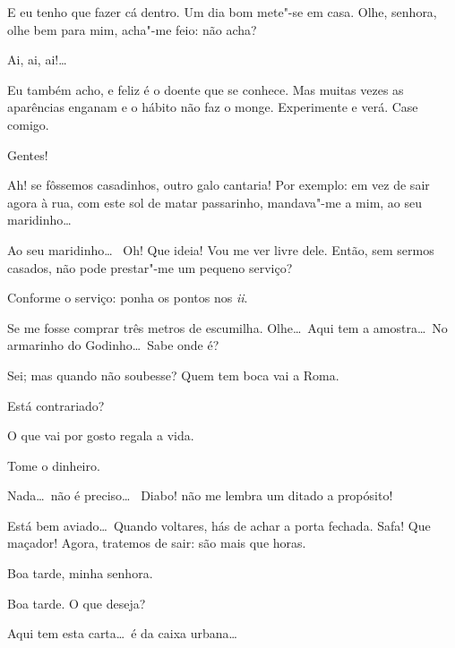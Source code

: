  E eu tenho que fazer cá dentro. Um dia bom mete"-se em casa.
 Olhe, senhora, olhe bem para mim, acha"-me feio: não acha?

  Ai, ai, ai!\ldots

  Eu também acho, e feliz é o doente que se conhece. Mas muitas
vezes as aparências enganam e o hábito não faz o monge. Experimente e verá.
 Case comigo.

  Gentes!

  Ah! se fôssemos casadinhos, outro galo cantaria! Por exemplo: em
vez de sair agora à rua, com este sol de matar passarinho, mandava"-me a mim, ao
seu maridinho\ldots

  Ao seu maridinho\ldots\ 
Oh! Que ideia! Vou me ver livre dele.  Então, sem sermos casados,
não pode prestar"-me um pequeno serviço?

  Conforme o serviço: ponha os pontos nos \textit{ii}.

  Se me fosse comprar três metros de escumilha. Olhe\ldots\ Aqui tem
a amostra\ldots\ No armarinho do Godinho\ldots\ Sabe onde é?

  Sei; mas quando não soubesse? Quem tem boca vai a Roma.

  Está contrariado?

  O que vai por gosto regala a vida.

  Tome o dinheiro.

  Nada\ldots\ não é preciso\ldots\ 
Diabo! não me lembra um ditado a propósito! 


\stagedir{\textsc{[Inês]}}

  Está bem aviado\ldots\ Quando voltares, hás de achar a porta
fechada. 
Safa! Que maçador! Agora, tratemos de sair: são mais que horas. 



  Boa tarde, minha senhora.

  Boa tarde. O que deseja?

  Aqui tem esta carta\ldots\ é da caixa urbana\ldots

